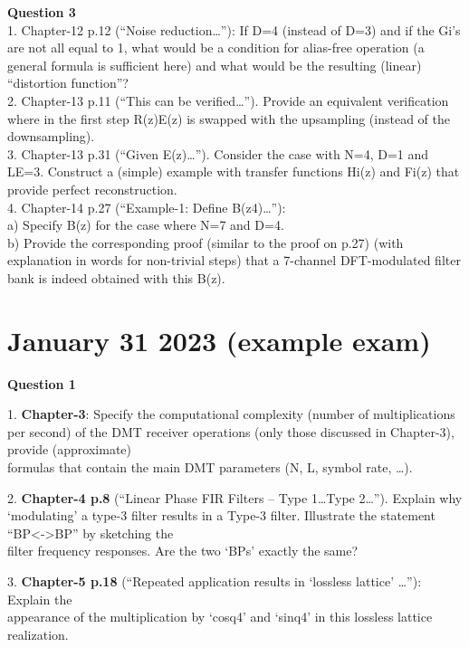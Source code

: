 \documentclass[
  a4paper,
  ,captions=tableheading
]{scrartcl}
\begin{document}
\textbf{Question 3}\\
1. Chapter-12 p.12 (``Noise reduction\ldots''): If D=4 (instead of D=3)
and if the Gi's are not all equal to 1, what would be a condition for
alias-free operation (a general formula is sufficient here) and what
would be the resulting (linear) ``distortion function''?\\
2. Chapter-13 p.11 (``This can be verified\ldots''). Provide an
equivalent verification where in the first step R(z)E(z) is swapped with
the upsampling (instead of the downsampling).\\
3. Chapter-13 p.31 (``Given E(z)\ldots''). Consider the case with N=4,
D=1 and LE=3. Construct a (simple) example with transfer functions Hi(z)
and Fi(z) that provide perfect reconstruction.\\
4. Chapter-14 p.27 (``Example-1: Define B(z4)\ldots''):\\
a) Specify B(z) for the case where N=7 and D=4.\\
b) Provide the corresponding proof (similar to the proof on p.27) (with
explanation in words for non-trivial steps) that a 7-channel
DFT-modulated filter bank is indeed obtained with this B(z).

\section{\texorpdfstring{\textbf{January 31 2023 (example
exam)}}{January 31 2023 (example exam)}}\label{january-31-2023-example-exam}

\textbf{Question 1}

1. \textbf{Chapter-3}: Specify the computational complexity (number of
multiplications per second) of the DMT receiver operations (only those
discussed in Chapter-3), provide (approximate)\\
formulas that contain the main DMT parameters (N, L, symbol rate,
\ldots).

2. \textbf{Chapter-4 p.8} (``Linear Phase FIR Filters -- Type
1\ldots Type 2\ldots''). Explain why `modulating' a type-3 filter
results in a Type-3 filter. Illustrate the statement
``BP\textless-\textgreater BP'' by sketching the\\
filter frequency responses. Are the two `BPs' exactly the same?

3. \textbf{Chapter-5 p.18} (``Repeated application results in `lossless
lattice' \ldots''): Explain the\\
appearance of the multiplication by `cosq4' and `sinq4' in this lossless
lattice realization.
\end{document}
